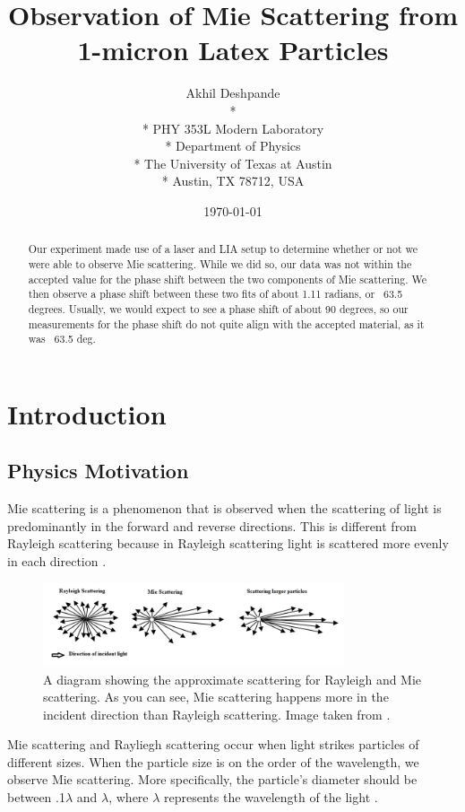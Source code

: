 \documentclass[10pt,letterpaper,onecolumn]{article}
\begin{document}
\title{Observation of Mie Scattering from 1-micron Latex Particles }


\author{
 Akhil Deshpande \\*
  \\*
 PHY 353L Modern Laboratory \\*
 Department of Physics \\*
 The University of Texas at Austin \\*
 Austin, TX 78712, USA
}
\date{\today}

\maketitle

\begin{abstract}
    Our experiment made use of a laser and LIA setup to determine whether or not we were able to observe Mie scattering. While we did so, our data was not within the accepted value for the phase shift between the two components of Mie scattering.
    We then observe a phase shift between these two fits of about 1.11 radians, or ~63.5 degrees. Usually, we would expect to see a phase shift of about 90 degrees, so our measurements for the phase shift do not quite align with the accepted material, as it was ~63.5 deg.
\end{abstract}


\section{Introduction}
\subsection{Physics Motivation}
Mie scattering is a phenomenon that is observed when the scattering of light
is predominantly in the forward and reverse directions. This is different from Rayleigh scattering
because in Rayleigh scattering light is scattered more evenly in each direction \cite{LightScattering2019}. 
\begin{figure}
    \begin{center}
        \includegraphics*[width=3.5in]{PatternsScatt.png}
        \caption{A diagram showing the approximate scattering for Rayleigh and Mie scattering.
        As you can see, Mie scattering happens more in the incident direction than Rayleigh scattering. 
        Image taken from \cite{LightScattering2019}.}
    \end{center}
\end{figure}
Mie scattering and Rayliegh scattering occur when light
strikes particles of different sizes. When the particle size is on the
order of the wavelength, we observe Mie scattering. More specifically, 
the particle's diameter should be between .1$\lambda$ and $\lambda$, where 
$\lambda$ represents the wavelength of the light \cite{Sharma:2003}.
\end{document}
